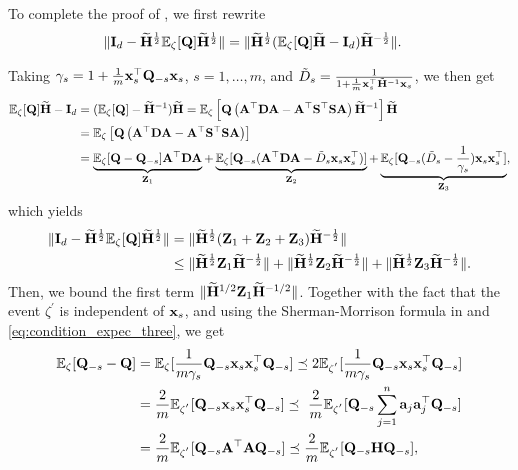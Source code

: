 \documentclass[11pt,a4paper]{article}
\begin{document}
  To complete the proof of  , we first rewrite
  \begin{align*}
  \|\mathbf{I}_d-\widetilde{\mathbf{H}}^{\frac{1}{2}}{\mathbb{E}}_{\zeta}[\mathbf{Q} ]\widetilde{\mathbf{H}}^{\frac{1}{2}}\|&=\|\widetilde{\mathbf{H}}^{\frac{1}{2}}({\mathbb{E}}_{\zeta}[\mathbf{Q} ]\widetilde{\mathbf{H}}-\mathbf{I}_d)\widetilde{\mathbf{H}}^{-\frac{1}{2}}\|.
\end{align*}
  
Taking $\gamma_s=1+\frac{1}{m}\mathbf{x}_s^\top\mathbf{Q}_{-s}\mathbf{x}_s$, $s=1,\ldots,m$, and $\tilde D_{s}=\frac{1}{1+\frac{1}{m}\mathbf{x}_s^\top\tilde{\mathbf{H}}^{-1}\mathbf{x}_s}$, we then get
\begin{align}
{\mathbb{E}}_{\zeta}[\mathbf{Q} ]\widetilde{\mathbf{H}}-\mathbf{I}_d&=({\mathbb{E}}_{\zeta}[\mathbf{Q} ]- \widetilde{\mathbf{H}}^{-1})\widetilde{\mathbf{H}}={\mathbb{E}}_{\zeta}\left[\mathbf{Q}\left(\mathbf{A}^\top\mathbf{D}\mathbf{A}- \mathbf{A}^\top  \mathbf{S}^\top\mathbf{S}\mathbf{A}\right)\widetilde{\mathbf{H}}^{-1}\right] \widetilde{\mathbf{H}} \nonumber\\
&={\mathbb{E}}_{\zeta}\left[\mathbf{Q}\left( \mathbf{A}^\top\mathbf{D}\mathbf{A}- \mathbf{A}^\top  \mathbf{S}^\top\mathbf{S}\mathbf{A}\right)\right] \nonumber\\
&=\underbrace{{\mathbb{E}}_{\zeta}[\mathbf{Q}-\mathbf{Q}_{-s}]\mathbf{A}^\top\mathbf{D}\mathbf{A}}_{\mathbf{Z}_1}+\underbrace{{\mathbb{E}}_{\zeta}[\mathbf{Q}_{-s}(\mathbf{A}^\top\mathbf{D}\mathbf{A}-\tilde D_{s}\mathbf{x}_s\mathbf{x}^\top_s)]}_{\mathbf{Z}_2} + \underbrace{{\mathbb{E}}_{\zeta}[\mathbf{Q}_{-s}(\tilde D_{s}-\frac{1}{\gamma_s})\mathbf{x}_s\mathbf{x}^\top_s]}_{\mathbf{Z}_3},
\nonumber 
\end{align}
which yields 
\begin{align}\label{eq:bound_rew}
  \|\mathbf{I}_d-\widetilde{\mathbf{H}}^{\frac{1}{2}}{\mathbb{E}}_{\zeta}[\mathbf{Q} ]\widetilde{\mathbf{H}}^{\frac{1}{2}}\|&=\|\widetilde{\mathbf{H}}^{\frac{1}{2}}(\mathbf{Z}_1+\mathbf{Z}_2+\mathbf{Z}_3)\widetilde{\mathbf{H}}^{-\frac{1}{2}}\|  \nonumber\\
  &\leq \|\widetilde{\mathbf{H}}^{\frac{1}{2}}\mathbf{Z}_1\widetilde{\mathbf{H}}^{-\frac{1}{2}}\|  +\|\widetilde{\mathbf{H}}^{\frac{1}{2}}\mathbf{Z}_2\widetilde{\mathbf{H}}^{-\frac{1}{2}}\|+\|\widetilde{\mathbf{H}}^{\frac{1}{2}}\mathbf{Z}_3\widetilde{\mathbf{H}}^{-\frac{1}{2}}\|. 
\end{align}
Then, we bound the first term  $\|\widetilde{\mathbf{H}}^{1/2}\mathbf{Z}_1\widetilde{\mathbf{H}}^{-1/2}\|$. Together with  the fact that the event $\zeta^{'}$ is independent of $\mathbf{x}_{s}$, and  using the Sherman-Morrison formula in  and \eqref{eq:condition_expec_three},  we get 
\begin{align}
    \EE_{\zeta}[\Q_{-s}-\Q]&=   \EE_{\zeta}[\frac{1}{m\gamma_s}\Q_{-s}\x_s\x^\top_s\Q_{-s}] \preceq  2\EE_{\zeta^{'}}[\frac{1}{m\gamma_s}\Q_{-s}\x_s\x^\top_s\Q_{-s}]  \nonumber\\
    &=\frac{2}{m}\EE_{\zeta^{'}}[\Q_{-s}\x_s\x^\top_s\Q_{-s}]  \preceq \ \frac{2}{m}\EE_{\zeta^{'}}[\Q_{-s}\sum^n_{j=1}\ba_j\ba_j^\top\Q_{-s}]\nonumber\\
    &=\frac{2}{m}\EE_{\zeta^{'}}[\Q_{-s}\A^\top\A\Q_{-s}]\preceq \frac{2}{m}\EE_{\zeta^{'}}[\Q_{-s}\H\Q_{-s}],\nonumber 
\end{align}
\end{document}

